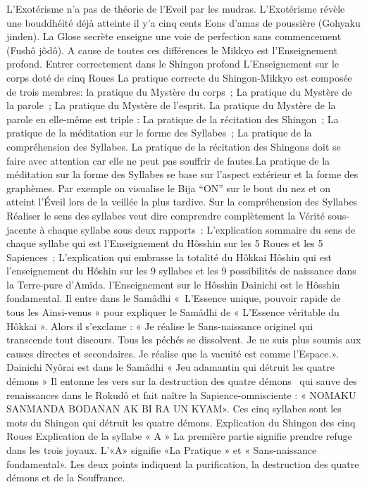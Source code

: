 L’Exotérisme n’a pas de théorie de l’Eveil par les mudras.
L’Exotérisme révèle une bouddhéité déjà atteinte il y’a cinq cents Eons d’amas de poussière (Gohyaku jinden).
La Glose secrète enseigne une voie de perfection sans commencement (Fushô jôdô).
A cause de toutes ces différences le Mikkyo est l'Enseignement profond.
Entrer correctement dans le Shingon profond
L’Enseignement sur le corps doté de cinq Roues
La pratique correcte du Shingon-Mikkyo est composée de trois membres:
la pratique du Mystère du corps ;
La pratique du Mystère de la parole ;
La pratique du Mystère de l’esprit.
La pratique du Mystère de la parole en elle-même est triple :
La pratique de la récitation des Shingon ;
La pratique de la méditation sur le forme des Syllabes ;
La pratique de la compréhension des Syllabes.
La pratique de la récitation des Shingons doit se faire avec attention car elle ne peut pas souffrir de fautes.La pratique de la méditation sur la forme des Syllabes se base sur l'aspect extérieur et la forme des graphèmes. Par exemple on visualise le Bija “ON” sur le bout du nez et on atteint l’Éveil lors de la veillée la plus tardive.
Sur la compréhension des Syllabes
Réaliser le sens des  syllabes veut dire comprendre complètement la Vérité sous-jacente à chaque syllabe sous deux rapports :
L'explication sommaire du sens de chaque syllabe qui est l’Enseignement du Hôsshin sur les 5 Roues et les 5 Sapiences ;
L'explication qui embrasse la totalité du Hôkkai Hôshin qui est l’enseignement du Hôshin sur les 9 syllabes et les 9 possibilités de naissance dans la Terre-pure d'Amida.
l'Enseignement sur le Hôsshin
Dainichi est le Hôsshin fondamental. Il entre dans le Samâdhi « L’Essence unique, pouvoir rapide de tous les Ainsi-venus » pour expliquer le Samâdhi de « L’Essence véritable du Hôkkai ». Alors il s'exclame :
« Je réalise le Sans-naissance originel qui transcende tout discours. Tous les péchés se dissolvent. Je ne suis plus soumis aux causes directes et secondaires. Je réalise que la vacuité est comme l’Espace.».
Dainichi Nyôrai est dans le Samâdhi « Jeu adamantin qui détruit les quatre démons »
Il entonne les vers sur la destruction des quatre démons  qui sauve des renaissances dans le Rokudô et fait naître la Sapience-omnisciente :
« NOMAKU SANMANDA BODANAN AK BI RA UN KYAM».
Ces cinq syllabes sont les mots du  Shingon qui détruit les quatre démons.
Explication du Shingon des cinq Roues
Explication de la syllabe « A »
 La première partie signifie prendre refuge dans les trois joyaux. L’«A» signifie  «La Pratique »  et « Sans-naissance fondamental».  Les deux points indiquent la purification, la destruction des quatre démons et de la Souffrance.
